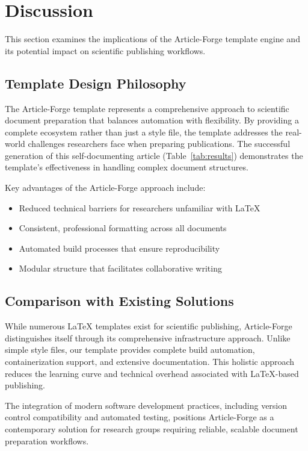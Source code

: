\section{Discussion}

This section examines the implications of the Article-Forge template engine and its potential impact on scientific publishing workflows.

\subsection{Template Design Philosophy}

The Article-Forge template represents a comprehensive approach to scientific document preparation that balances automation with flexibility. By providing a complete ecosystem rather than just a style file, the template addresses the real-world challenges researchers face when preparing publications. The successful generation of this self-documenting article (Table~\ref{tab:results}) demonstrates the template's effectiveness in handling complex document structures.

Key advantages of the Article-Forge approach include:
\begin{itemize}
    \item Reduced technical barriers for researchers unfamiliar with LaTeX
    \item Consistent, professional formatting across all documents
    \item Automated build processes that ensure reproducibility
    \item Modular structure that facilitates collaborative writing
\end{itemize}

\subsection{Comparison with Existing Solutions}

While numerous LaTeX templates exist for scientific publishing, Article-Forge distinguishes itself through its comprehensive infrastructure approach. Unlike simple style files, our template provides complete build automation, containerization support, and extensive documentation. This holistic approach reduces the learning curve and technical overhead associated with LaTeX-based publishing.

The integration of modern software development practices, including version control compatibility and automated testing, positions Article-Forge as a contemporary solution for research groups requiring reliable, scalable document preparation workflows.

